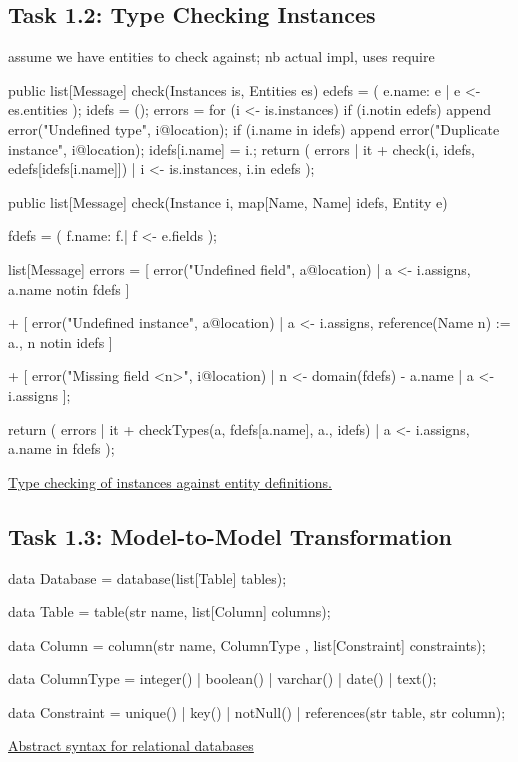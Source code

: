 \documentclass[a4paper]{article}
\def\source#1#2{\href{http://svn.rascal-mpl.org/lwc/trunk/lwc11/src/#1}{#2}}
\begin{document}
\subsection*{Task 1.2: Type Checking Instances}

assume we have entities to check against; nb actual impl, uses require

\begin{listing}
\begin{rascal}
public list[Message] check(Instances is, Entities es) {
    edefs = ( e.name: e | e <- es.entities );
    idefs = ();
    errors = for (i <- is.instances) {
        if (i.\type notin edefs) {
              append error("Undefined type", i@location);
        }
        if (i.name in idefs) {
            append error("Duplicate instance", i@location);
        }
        idefs[i.name] = i.\type;
    }
    return ( errors | it + check(i, idefs, edefs[idefs[i.name]]) 
                    | i <- is.instances, i.\type in edefs );
}

public list[Message] check(Instance i, map[Name, Name] idefs, Entity e) {
    fdefs = ( f.name: f.\type | f <- e.fields );
    
    list[Message] errors = 
        [ error("Undefined field", a@location) 
            | a <- i.assigns, a.name notin fdefs ]
    
        + [ error("Undefined instance", a@location)
            | a <- i.assigns,  reference(Name n) := a.\value, n notin idefs ]
                
        + [ error("Missing field <n>", i@location) 
            | n <- domain(fdefs) - { a.name | a <- i.assigns } ];
    
    return ( errors | it + checkTypes(a, fdefs[a.name], a.\value, idefs) 
                    | a <- i.assigns, a.name in fdefs );
}
\end{rascal}
\caption{\source{lang/instances/check/Instances.rsc}{Type checking of
    instances against entity definitions.}\label{LST:checkInstances}}
\end{listing}


\subsection*{Task 1.3: Model-to-Model Transformation}

\begin{listing}
\begin{rascal}
data Database = database(list[Table] tables);

data Table = table(str name, list[Column] columns);

data Column 
     = column(str name, ColumnType \type, list[Constraint] constraints);

data ColumnType = integer() | boolean() | varchar() | date() | text();
    
data Constraint 
     = unique() | key() | notNull() | references(str table, str column);
\end{rascal}
\caption{\source{lang/database/ast/Database.rsc}{Abstract syntax for
    relational databases}}\label{LST:database}
\end{listing}
\end{document}
